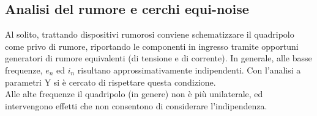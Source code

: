 %
%
%
%
%
%
%
%
%
%
%
%
%
%
%
%

\subsection{Analisi del rumore e cerchi equi-noise}

Al solito, trattando dispositivi rumorosi conviene schematizzare il quadripolo come privo di rumore, riportando le componenti in ingresso tramite opportuni generatori di rumore equivalenti (di tensione e di corrente). In generale, alle basse frequenze, $e_n$ ed $i_n$ risultano approssimativamente indipendenti.
Con l'analisi a parametri Y si è cercato di rispettare questa condizione.
\\
Alle alte frequenze il quadripolo (in genere) non è più unilaterale, ed intervengono effetti che non consentono di considerare l'indipendenza.

